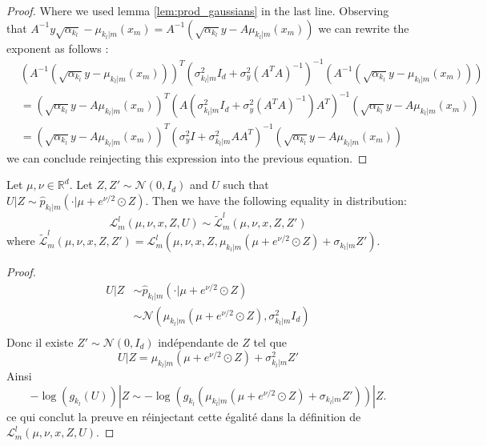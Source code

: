 \documentclass[12pt]{article}
\begin{document}
\begin{proof}
    Where we used lemma \ref{lem:prod_gaussians} in the last line. 
    Observing that $A^{-1}y\sqrt{\alpha_{k_l}} - \mu_{k_l|m}(x_m) = A^{-1}(\sqrt{\alpha_{k_l}}y - A \mu_{k_l|m}(x_m))$
    we can rewrite the exponent as follows :
    \begin{align*}
        & (A^{-1}(\sqrt{\alpha_{k_l}}y - \mu_{k_l|m}(x_m)))^T 
        (\sigma_{k_l|m}^2I_d + \sigma_y^2 (A^T A)^{-1})^{-1}
        (A^{-1}(\sqrt{\alpha_{k_l}}y - \mu_{k_l|m}(x_m))) \\
        & = (\sqrt{\alpha_{k_l}}y - A \mu_{k_l|m}(x_m))^T 
        \left( A(\sigma_{k_l|m}^2I_d + \sigma_y^2 (A^T A)^{-1})A^T \right)^{-1}
        (\sqrt{\alpha_{k_l}}y - A \mu_{k_l|m}(x_m)) \\
        & = (\sqrt{\alpha_{k_l}}y - A \mu_{k_l|m}(x_m))^T 
        (\sigma_y^2 I + \sigma_{k_l|m}^2 A A^T)^{-1}
        (\sqrt{\alpha_{k_l}}y - A \mu_{k_l|m}(x_m))
    \end{align*}
    we can conclude reinjecting this expression into the previous equation.
\end{proof}

\begin{assumption}
    Let $\mu, \nu \in \mathbb{R}^d$.
    Let $Z, Z' \sim \mathcal{N}(0, I_d)$ and $U$ such that 
    $U | Z \sim \hat{p}_{k_l|m}(\cdot|\mu + e^{\nu/2} \odot Z)$. 
    Then we have the following equality in distribution:
    $$\mathcal{L}^l_m(\mu, \nu, x, Z, U) \sim \tilde{\mathcal{L}}^l_m(\mu, \nu, x, Z, Z')$$
    where $\tilde{\mathcal{L}}^l_m(\mu, \nu, x, Z, Z') = \mathcal{L}^l_m(\mu, \nu, x, Z,
    \mu_{k_l|m}(\mu + e^{\nu/2} \odot Z) + \sigma_{k_l|m} Z')$.
\end{assumption}

\begin{proof}
\begin{align*}
U | Z &\sim \hat{p}_{k_l|m}(\cdot|\mu + e^{\nu/2} \odot Z) \\
& \sim \mathcal{N}(\mu_{k_l|m}(\mu + e^{\nu/2} \odot Z), \sigma_{k_l|m}^2 I_d) \\
\end{align*}
Donc il existe $Z' \sim \mathcal{N}(0, I_d)$ indépendante de $Z$ tel que
$$U | Z = \mu_{k_l|m}(\mu + e^{\nu/2} \odot Z) + \sigma_{k_l|m}^2 Z'$$
Ainsi
$$ - \log(g_{k_l}(U)) | Z \sim - \log(g_{k_l}(\mu_{k_l|m}(\mu + e^{\nu/2} \odot Z) + \sigma_{k_l|m} Z')) |Z.$$
ce qui conclut la preuve en réinjectant cette égalité dans la définition de
$\mathcal{L}^l_m(\mu, \nu, x, Z, U)$.
\end{proof}
\end{document}
